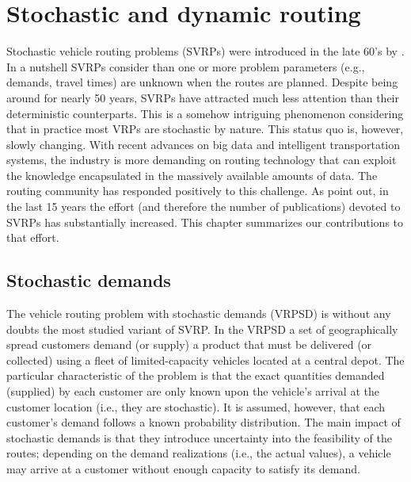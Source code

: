 \chapter{Stochastic and dynamic routing}
Stochastic vehicle routing problems (SVRPs) were introduced in the late 60's by \citet{Tillman1969}. In a nutshell SVRPs consider than one or more problem parameters (e.g., demands, travel times) are unknown when the routes are planned. Despite being around for nearly 50 years, SVRPs have attracted much less attention than their deterministic counterparts. This is a somehow intriguing phenomenon considering that in practice most VRPs are stochastic by nature. This status quo is, however, slowly changing. With recent advances on big data and intelligent transportation systems, the industry is more demanding on routing technology that can exploit the knowledge encapsulated in the massively available amounts of data. The routing community has responded positively to this challenge. As \citet{Gendreau2016} point out, in the last 15 years the effort (and therefore the number of publications) devoted to SVRPs has substantially increased. This chapter summarizes our contributions to that effort. %


\section{Stochastic demands}

The vehicle routing problem with stochastic demands (VRPSD) is without any doubts the most studied variant of SVRP. In the VRPSD a set of geographically spread customers demand (or supply) a product that must be delivered (or collected) using a fleet of limited-capacity vehicles located at a central depot. The particular characteristic of the problem is that the exact quantities demanded (supplied) by each customer are only known upon the vehicle's arrival at the customer location (i.e., they are stochastic). It is assumed, however, that each customer's demand follows a known probability distribution. The main impact of stochastic demands is that they introduce uncertainty into the feasibility of the routes; depending on the demand realizations (i.e., the actual values), a vehicle may arrive at a customer without enough capacity to satisfy its demand.

